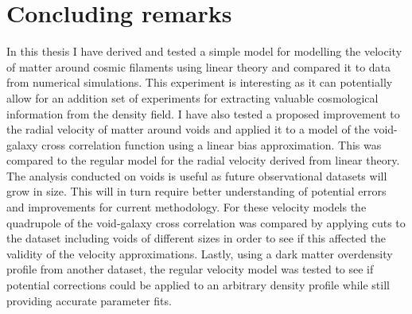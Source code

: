\chapter{Concluding remarks}\label{sec:conclusion}
In this thesis I have derived and tested a simple model for modelling the velocity of matter around cosmic filaments using linear theory and compared it to data from numerical simulations. This experiment is interesting as it can potentially allow for an addition set of experiments for extracting valuable cosmological information from the density field. I have also tested a proposed improvement to the radial velocity of matter around voids and applied it to a model of the void-galaxy cross correlation function using a linear bias approximation. This was compared to the regular model for the radial velocity derived from linear theory. The analysis conducted on voids is useful as future observational datasets will grow in size. This will in turn require better understanding of potential errors and improvements for current methodology. For these velocity models the quadrupole of the void-galaxy cross correlation was compared by applying cuts to the dataset including voids of different sizes in order to see if this affected the validity of the velocity approximations. Lastly, using a dark matter overdensity profile from another dataset, the regular velocity model was tested to see if potential corrections could be applied to an arbitrary density profile while still providing accurate parameter fits.
